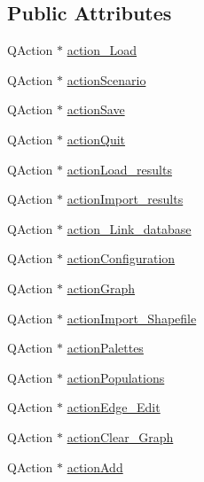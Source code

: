 \subsection*{Public Attributes}
\begin{DoxyCompactItemize}
\item 
Q\+Action $\ast$ \mbox{\hyperlink{class_ui___main_window_a738e92d19d3efa6a6c8c7054f23fbd26}{action\+\_\+\+Load}}
\item 
Q\+Action $\ast$ \mbox{\hyperlink{class_ui___main_window_a91ef94d021fd0fa7ffbaa50fa6d64cbb}{action\+Scenario}}
\item 
Q\+Action $\ast$ \mbox{\hyperlink{class_ui___main_window_a6e14788227f1a0dbc8cf983514685f3b}{action\+Save}}
\item 
Q\+Action $\ast$ \mbox{\hyperlink{class_ui___main_window_a188c243f36a2dbc10e4e2a0ad94273b1}{action\+Quit}}
\item 
Q\+Action $\ast$ \mbox{\hyperlink{class_ui___main_window_ad0b1310ef15d8df0016e68cec424efdf}{action\+Load\+\_\+results}}
\item 
Q\+Action $\ast$ \mbox{\hyperlink{class_ui___main_window_a215764b20011afe902e90cfe2d27dba1}{action\+Import\+\_\+results}}
\item 
Q\+Action $\ast$ \mbox{\hyperlink{class_ui___main_window_aaaf8f00887a9f7d7d14a231cc9e98435}{action\+\_\+\+Link\+\_\+database}}
\item 
Q\+Action $\ast$ \mbox{\hyperlink{class_ui___main_window_aa2c71d96d12d8103436804c3fda3855d}{action\+Configuration}}
\item 
Q\+Action $\ast$ \mbox{\hyperlink{class_ui___main_window_a52781b6f6d78ecde60faa920e3d953ab}{action\+Graph}}
\item 
Q\+Action $\ast$ \mbox{\hyperlink{class_ui___main_window_a8ec158c5db21f2a0c5f3d0105a74a638}{action\+Import\+\_\+\+Shapefile}}
\item 
Q\+Action $\ast$ \mbox{\hyperlink{class_ui___main_window_a41d48a282e8e11817ff9e3a2b6f0da81}{action\+Palettes}}
\item 
Q\+Action $\ast$ \mbox{\hyperlink{class_ui___main_window_aed706e37e161b8091c2705e11db010a7}{action\+Populations}}
\item 
Q\+Action $\ast$ \mbox{\hyperlink{class_ui___main_window_ab6428a2b0cff748bbb835c51580d764a}{action\+Edge\+\_\+\+Edit}}
\item 
Q\+Action $\ast$ \mbox{\hyperlink{class_ui___main_window_a7597ccf0f05da7f97f63f5ed4238b1e7}{action\+Clear\+\_\+\+Graph}}
\item 
Q\+Action $\ast$ \mbox{\hyperlink{class_ui___main_window_af4aed7036da6149ca94759ce8bdba4ab}{action\+Add}}

\end{DoxyCompactItemize}
